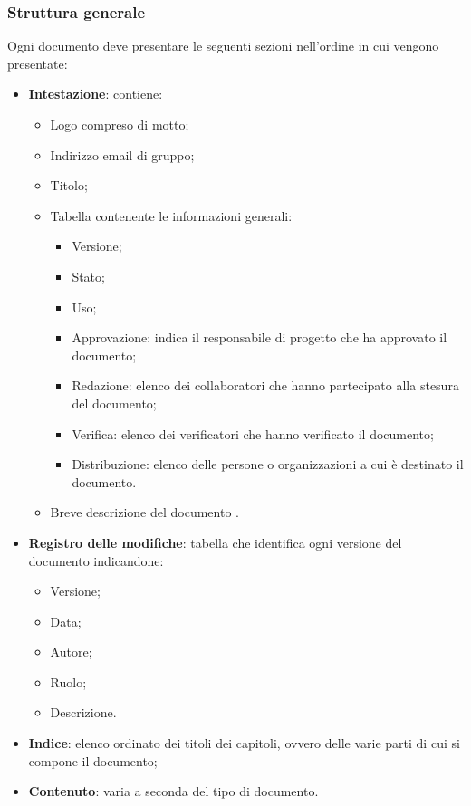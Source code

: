 \subsubsection{Struttura generale}
Ogni documento deve presentare le seguenti sezioni nell'ordine in cui vengono presentate:
\begin{itemize} 
    \item \textbf{Intestazione}:
    contiene:
    \begin{itemize} 
        \item Logo compreso di motto;
        \item Indirizzo email di gruppo; 
        \item Titolo;
        \item Tabella contenente le informazioni generali:
        \begin{itemize}
            \item Versione;
            \item Stato;
            \item Uso;
            \item Approvazione: indica il responsabile di progetto che ha approvato il documento; 
            \item Redazione: elenco dei collaboratori che hanno partecipato alla stesura del documento;
            \item Verifica: elenco dei verificatori che hanno verificato il documento;
            \item Distribuzione: elenco delle persone o organizzazioni a cui è destinato il documento.
        \end{itemize}
        \item Breve descrizione del documento .
    \end{itemize}
    \item \textbf{Registro delle modifiche}:
    tabella che identifica ogni versione del documento indicandone:
    \begin{itemize} 
        \item Versione;
        \item Data;
        \item Autore;
        \item Ruolo;
        \item Descrizione.
    \end{itemize}
    \item \textbf{Indice}:
    elenco ordinato dei titoli dei capitoli, ovvero delle varie parti di cui si compone il documento;
    \item \textbf{Contenuto}:
    varia a seconda del tipo di documento.
\end{itemize}